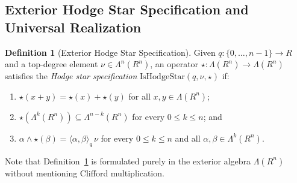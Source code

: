 \documentclass[11pt]{article}
\theoremstyle{definition}
\newtheorem{definition}[theorem]{Definition}
\begin{document}
\subsection{Exterior Hodge Star Specification and Universal Realization}

\begin{definition}[Exterior Hodge Star Specification]\label{def:hodge}
Given $q : \{0,\dots,n-1\} \to R$ and a top-degree element $\nu \in \Lambda^n(R^n)$, an operator $\star : \Lambda(R^n) \to \Lambda(R^n)$ satisfies the \emph{Hodge star specification} $\mathrm{IsHodgeStar}(q, \nu, \star)$ if:
\begin{enumerate}
  \item[(i)] $\star(x + y) = \star(x) + \star(y)$ for all $x, y \in \Lambda(R^n)$;
  \item[(ii)] $\star(\Lambda^k(R^n)) \subseteq \Lambda^{n-k}(R^n)$ for every $0 \le k \le n$; and
  \item[(iii)] $\alpha \wedge \star(\beta) = \langle \alpha, \beta \rangle_q \, \nu$ for every $0 \le k \le n$ and all $\alpha, \beta \in \Lambda^k(R^n)$.
\end{enumerate}
\end{definition}

Note that Definition~\ref{def:hodge} is formulated purely in the exterior algebra $\Lambda(R^n)$ without mentioning Clifford multiplication.
\end{document}
